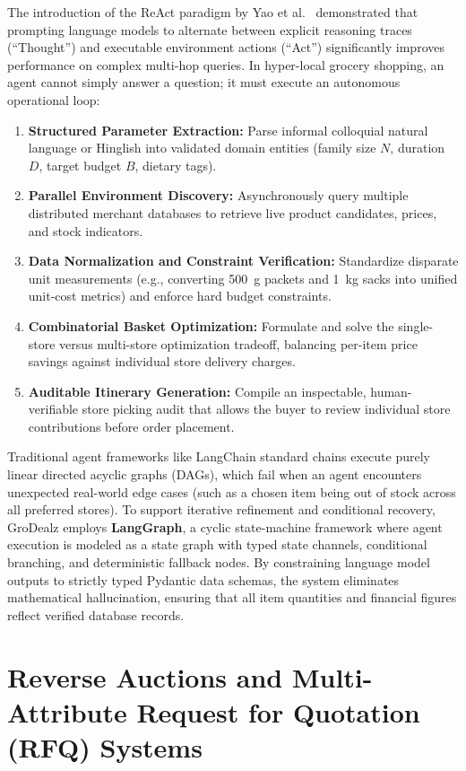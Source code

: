 The introduction of the ReAct paradigm by Yao et al.~\cite{yao2022react} demonstrated that prompting language models to alternate between explicit reasoning traces (``Thought'') and executable environment actions (``Act'') significantly improves performance on complex multi-hop queries. In hyper-local grocery shopping, an agent cannot simply answer a question; it must execute an autonomous operational loop:
\begin{enumerate}
    \item \textbf{Structured Parameter Extraction:} Parse informal colloquial natural language or Hinglish into validated domain entities (family size $N$, duration $D$, target budget $B$, dietary tags).
    \item \textbf{Parallel Environment Discovery:} Asynchronously query multiple distributed merchant databases to retrieve live product candidates, prices, and stock indicators.
    \item \textbf{Data Normalization and Constraint Verification:} Standardize disparate unit measurements (e.g., converting 500~g packets and 1~kg sacks into unified unit-cost metrics) and enforce hard budget constraints.
    \item \textbf{Combinatorial Basket Optimization:} Formulate and solve the single-store versus multi-store optimization tradeoff, balancing per-item price savings against individual store delivery charges.
    \item \textbf{Auditable Itinerary Generation:} Compile an inspectable, human-verifiable store picking audit that allows the buyer to review individual store contributions before order placement.
\end{enumerate}

Traditional agent frameworks like LangChain standard chains execute purely linear directed acyclic graphs (DAGs), which fail when an agent encounters unexpected real-world edge cases (such as a chosen item being out of stock across all preferred stores). To support iterative refinement and conditional recovery, GroDealz employs \textbf{LangGraph}, a cyclic state-machine framework where agent execution is modeled as a state graph with typed state channels, conditional branching, and deterministic fallback nodes. By constraining language model outputs to strictly typed Pydantic data schemas, the system eliminates mathematical hallucination, ensuring that all item quantities and financial figures reflect verified database records.

\section{Reverse Auctions and Multi-Attribute Request for Quotation (RFQ) Systems}

